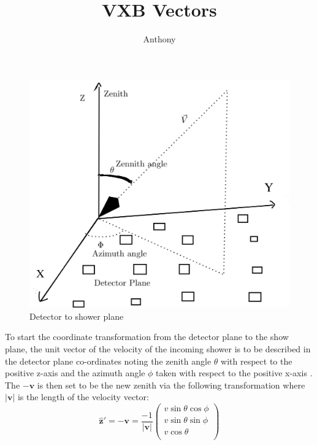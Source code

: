 \documentclass[11pt]{article}
\begin{document}
\author{Anthony}
\title{VXB Vectors}
\maketitle

\begin{figure}[h]
\centering
  \includegraphics[scale=0.2]{vvv.JPG}
  \caption{Detector to shower plane }
  \label{fig:boat1}
\end{figure}

To start the coordinate transformation from the detector plane to the show plane, the unit vector of the velocity of the incoming shower is to be  described in the detector plane co-ordinates noting the zenith angle $\theta$ with respect to the positive z-axis and the azimuth angle $\phi$ taken with respect to the positive x-axis  . The $\mathbf{-{v}}$ is then set to be the new zenith via the following transformation where $\mathbf{|v|}$ is the length of the velocity vector:
\begin{equation}
    \mathbf{\hat{z}'}=\mathbf{-{v}} = \frac{-1}{\left|\mathbf{{v}}\right|}\left(
    \begin{array}{c}
    v\sin\theta \cos\phi \\ 	
    v\sin\theta \sin\phi \\ 
    v\cos\theta \\
\end{array} 
\right)
\end{equation}
\end{document}
